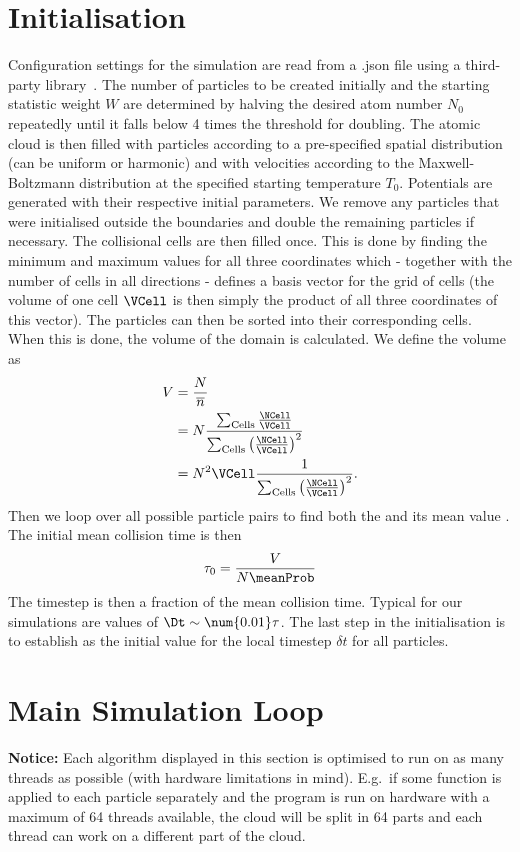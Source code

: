 \section{Initialisation}
Configuration settings for the simulation are read from a .json file using a third-party \Cpp library~\cite{nlohmann}. 
The number of particles to be created initially and the starting statistic weight $W$ are determined by halving the desired atom number $N_0$ repeatedly until it falls below 4 times the threshold for doubling.
The atomic cloud is then filled with particles according to a pre-specified spatial distribution (can be uniform or harmonic) and with velocities according to the Maxwell-Boltzmann distribution at the specified starting temperature $T_0$.
Potentials are generated with their respective initial parameters.
We remove any particles that were initialised outside the boundaries and double the remaining particles if necessary.
The collisional cells are then filled once. This is done by finding the minimum and maximum values for all three coordinates which - together with the number of cells in all directions - defines a basis vector for the grid of cells (the volume of one cell $\VCell$ is then simply the product of all three coordinates of this vector). The particles can then be sorted into their corresponding cells. When this is done, the volume of the domain is calculated. We define the volume as
\begin{align*}
    V &= \frac{N}{\overline{n}} \\
    &= N \frac{\sum_\text{Cells} \frac{\NCell}{\VCell}}{\sum_\text{Cells} \left(\frac{\NCell}{\VCell}\right)^2} \\
    & = N^2\VCell \frac{1}{\sum_\text{Cells} \left(\frac{\NCell}{\VCell}\right)^2}.
\end{align*}
Then we loop over all possible particle pairs to find both the \maxProb and its mean value \meanProb. The initial mean collision time is then
\begin{equation*}
    \tau_0 = \frac{V}{N\meanProb}
\end{equation*}
The timestep \Dt is then a fraction of the mean collision time. Typical for our simulations are values of $\Dt \sim \num{0.01}\tau$. The last step in the initialisation is to establish \Dt as the initial value for the local timestep $\delta t$ for all particles.
%
\section{Main Simulation Loop}
\textbf{Notice:} Each algorithm displayed in this section is optimised to run on as many threads as possible (with hardware limitations in mind). E.g.\ if some function is applied to each particle separately and the program is run on hardware with a maximum of 64 threads available, the cloud will be split in 64 parts and each thread can work on a different part of the cloud.

